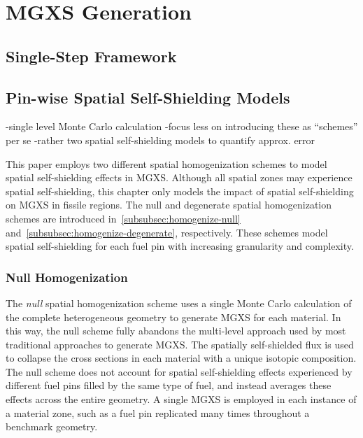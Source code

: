 \section{MGXS Generation}
\label{sec:mgxs-generation}

\subsection{Single-Step Framework}
\label{subsec:single-level}


\subsection{Pin-wise Spatial Self-Shielding Models}
\label{subsec:homogenize}

-single level Monte Carlo calculation
-focus less on introducing these as ``schemes'' per se
  -rather two spatial self-shielding models to quantify approx. error

This paper employs two different spatial homogenization schemes to model spatial self-shielding effects in MGXS. Although all spatial zones may experience spatial self-shielding, this chapter only models the impact of spatial self-shielding on MGXS in fissile regions. The null and degenerate spatial homogenization schemes are introduced in~\autoref{subsubsec:homogenize-null} and~\autoref{subsubsec:homogenize-degenerate}, respectively. These schemes model spatial self-shielding for each fuel pin with increasing granularity and complexity. 


\subsubsection{Null Homogenization}
\label{subsubsec:homogenize-null}

The \textit{null} spatial homogenization scheme uses a single Monte Carlo calculation of the complete heterogeneous geometry to generate MGXS for each material. In this way, the null scheme fully abandons the multi-level approach used by most traditional approaches to generate MGXS. The spatially self-shielded flux is used to collapse the cross sections in each material with a unique isotopic composition. The null scheme does not account for spatial self-shielding effects experienced by different fuel pins filled by the same type of fuel, and instead averages these effects across the entire geometry. A single MGXS is employed in each instance of a material zone, such as a fuel pin replicated many times throughout a benchmark geometry.

